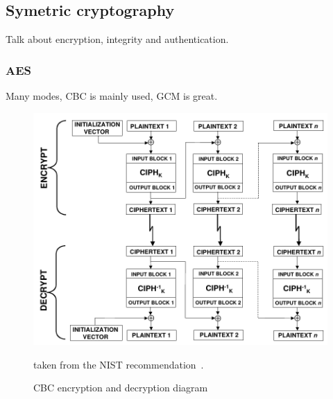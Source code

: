 \subsection{Symetric cryptography}
Talk about encryption, integrity and authentication.


\subsubsection{AES}
Many modes, CBC is mainly used, GCM is great.

\begin{figure}
\includegraphics[width=\textwidth]{nist-cbc}
\caption{CBC encryption and decryption diagram}{taken from the NIST recommendation~\cite{nist-sp800-38A}.}
\label{fig:cbc-encrypt-decrypt}
\end{figure}

